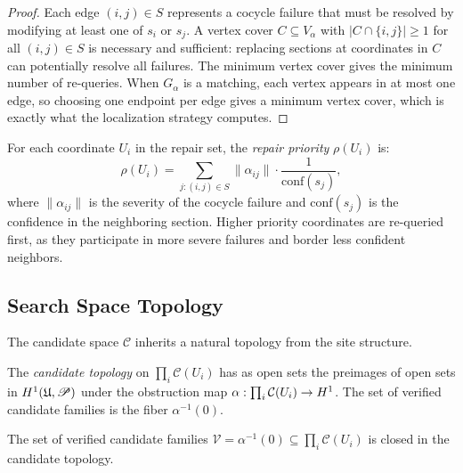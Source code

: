 \documentclass[11pt]{article}
\newcommand{\CandSpace}{\mathcal{C}}
\newcommand{\ProofSheaf}{\mathscr{P}}
\begin{document}
\begin{proof}
Each edge $(i,j) \in S$ represents a cocycle failure that must be
resolved by modifying at least one of $s_i$ or $s_j$.  A vertex
cover $C \subseteq V_\alpha$ with $|C \cap \{i,j\}| \geq 1$ for
all $(i,j) \in S$ is necessary and sufficient: replacing sections
at coordinates in $C$ can potentially resolve all failures.  The
minimum vertex cover gives the minimum number of re-queries.
When $G_\alpha$ is a matching, each vertex appears in at most one
edge, so choosing one endpoint per edge gives a minimum vertex cover,
which is exactly what the localization strategy computes.
\end{proof}

\begin{definition}\label{def:repair-priority}
For each coordinate $U_i$ in the repair set, the \emph{repair priority}
$\rho(U_i)$ is:
\[
  \rho(U_i) = \sum_{j : (i,j) \in S} \|\alpha_{ij}\| \cdot
  \frac{1}{\mathrm{conf}(s_j)},
\]
where $\|\alpha_{ij}\|$ is the severity of the cocycle failure and
$\mathrm{conf}(s_j)$ is the confidence in the neighboring section.
Higher priority coordinates are re-queried first, as they participate
in more severe failures and border less confident neighbors.
\end{definition}

\subsection{Search Space Topology}\label{subsec:search-topology}

The candidate space $\CandSpace$ inherits a natural topology from the
site structure.

\begin{definition}\label{def:cand-topology}
The \emph{candidate topology} on $\prod_i \CandSpace(U_i)$ has as
open sets the preimages of open sets in $\Hcoh{1}(\mathfrak{U}, \ProofSheaf)$
under the obstruction map
$\alpha : \prod_i \CandSpace(U_i) \to \Hcoh{1}$.  The set of
verified candidate families is the fiber $\alpha^{-1}(0)$.
\end{definition}

\begin{proposition}\label{prop:closed}
The set of verified candidate families
$\mathcal{V} = \alpha^{-1}(0) \subseteq \prod_i \CandSpace(U_i)$
is closed in the candidate topology.
\end{proposition}
\end{document}
